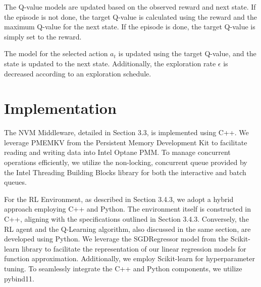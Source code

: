 The Q-value models are updated based on the observed reward and next state. If the episode is not done, the target Q-value is calculated using the reward and the maximum Q-value for the next state. If the episode is done, the target Q-value is simply set to the reward.

The model for the selected action $a_t$ is updated using the target Q-value, and the state is updated to the next state. Additionally, the exploration rate $\epsilon$ is decreased according to an exploration schedule.

\section{Implementation}

The NVM Middleware, detailed in Section 3.3, is implemented using C++. We leverage PMEMKV from the Persistent Memory Development Kit \cite{scargall2020pmem} to facilitate reading and writing data into Intel Optane PMM. To manage concurrent operations efficiently, we utilize the non-locking, concurrent queue provided by the Intel Threading Building Blocks \cite{tbb:online} library for both the interactive and batch queues.

For the RL Environment, as described in Section 3.4.3, we adopt a hybrid approach employing C++ and Python. The environment itself is constructed in C++, aligning with the specifications outlined in Section 3.4.3. Conversely, the RL agent and the Q-Learning algorithm, also discussed in the same section, are developed using Python. We leverage the SGDRegressor model from the Scikit-learn\cite{scikitle61:online} library to facilitate the representation of our linear regression models for function approximation. Additionally, we employ Scikit-learn for hyperparameter tuning. To seamlessly integrate the C++ and Python components, we utilize pybind11\cite{pybind1111:online}.